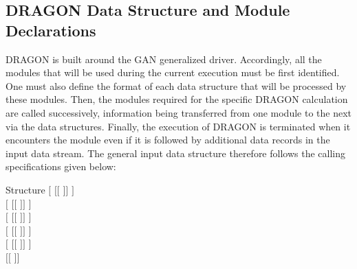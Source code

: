 \subsection{DRAGON Data Structure and Module Declarations}\label{sect:StrucMod}

DRAGON is built around the GAN generalized driver.\cite{utilitaire}
Accordingly, all the modules that will be used during the current execution must
be first identified. One must also define the format of each data structure that
will be processed by these modules. Then, the modules required for the specific
DRAGON calculation are called successively, information being
transferred from one module to the next via the data structures. Finally,
the execution of DRAGON is terminated when it encounters the  module
even if it is followed by additional data records in the input data stream. The
general input data structure therefore follows the calling specifications given
below:

\begin{DataStructure}{Structure }
$[$  $[[$  $]]$ \moc{;} $]$ \\
$[$  $[[$  $]]$ \moc{;} $]$ \\
$[$  $[[$  $]]$ \moc{;} $]$ \\
$[$  $[[$  $]]$ \moc{;} $]$ \\
$[$  $[[$  $]]$ \moc{;} $]$ \\
$[[$   \moc{;} $]]$ \\
 \moc{;}
\end{DataStructure}

